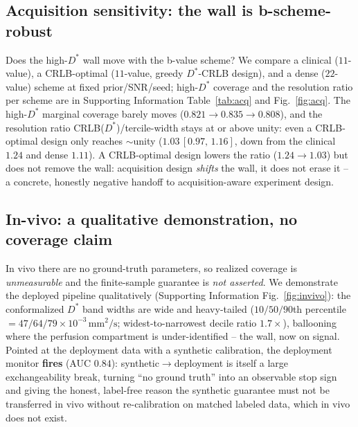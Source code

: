 \documentclass[11pt]{article}
\newcommand{\Dstar}{D^{*}}
\newcommand{\unit}[1]{\,\mathrm{#1}}
\newcommand{\band}[2]{{\scriptsize\,$[#1,\,#2]$}}
\begin{document}
\subsection{Acquisition sensitivity: the wall is b-scheme-robust}
\label{sec:acquisition}
Does the high-$\Dstar$ wall move with the b-value scheme? We compare a clinical
($11$-value), a CRLB-optimal ($11$-value, greedy $\Dstar$-CRLB design), and a dense
($22$-value) scheme at fixed prior/SNR/seed; high-$\Dstar$ coverage and the
resolution ratio per scheme are in Supporting Information Table~\ref{tab:acq} and
Fig.~\ref{fig:acq}. The high-$\Dstar$ marginal coverage barely moves
($0.821\to0.835\to0.808$), and the resolution ratio CRLB($\Dstar$)/tercile-width
stays at or above unity: even a CRLB-optimal design only reaches $\sim$unity
($1.03$\band{0.97}{1.16}, down from the clinical $1.24$ and dense $1.11$). A
CRLB-optimal design lowers the ratio ($1.24\to1.03$) but does not remove the wall:
acquisition design \emph{shifts} the wall, it does not erase it -- a concrete,
honestly negative handoff to acquisition-aware experiment design.

\subsection{In-vivo: a qualitative demonstration, no coverage claim}
\label{sec:invivo}
In vivo there are no ground-truth parameters, so realized coverage is
\emph{unmeasurable} and the finite-sample guarantee is \emph{not asserted}. We
demonstrate the deployed pipeline qualitatively (Supporting Information
Fig.~\ref{fig:invivo}): the conformalized $\Dstar$ band widths are wide and
heavy-tailed ($10/50/90$th percentile $=47/64/79\times10^{-3}\unit{mm^2/s}$;
widest-to-narrowest decile ratio $1.7\times$), ballooning where the perfusion
compartment is under-identified -- the wall, now on signal. Pointed at the deployment
data with a synthetic calibration, the deployment monitor \textbf{fires} (AUC $0.84$):
synthetic$\to$deployment is itself a large exchangeability break, turning ``no ground
truth'' into an observable stop sign and giving the honest, label-free reason the
synthetic guarantee must not be transferred in vivo without re-calibration on matched
labeled data, which in vivo does not exist.
\end{document}

